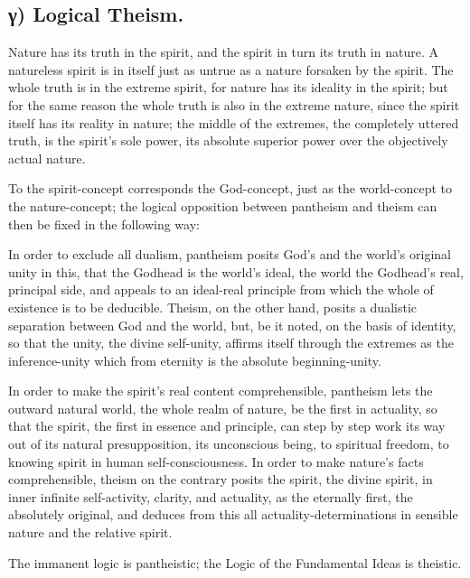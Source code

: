 \documentclass[12pt]{book}
\begin{document}
\subsection*{γ) Logical Theism.}

Nature has its truth in the spirit, and the spirit in turn its truth
in nature. A natureless spirit is in itself just as untrue as a
nature forsaken by the spirit. The whole truth is in the extreme
spirit, for nature has its ideality in the spirit; but for the same
reason the whole truth is also in the extreme nature, since the
spirit itself has its reality in nature; the middle of the extremes,
the completely uttered truth, is the spirit's sole power, its
absolute superior power over the objectively actual nature.

To the spirit-concept corresponds the God-concept, just as the
world-concept to the nature-concept; the logical opposition between
pantheism and theism can then be fixed in the following way:

In order to exclude all dualism, pantheism posits God's and the
world's original unity in this, that the Godhead is the world's
ideal, the world the Godhead's real, principal side, and appeals to
an ideal-real principle from which the whole of existence is to be
deducible. Theism, on the other hand, posits a
dualistic separation between God and the world, but, be it noted, on
the basis of identity, so that the unity, the divine self-unity,
affirms itself through the extremes as the inference-unity which
from eternity is the absolute beginning-unity.

In order to make the spirit's real content comprehensible, pantheism
lets the outward natural world, the whole realm of nature, be the
first in actuality, so that the spirit, the first in essence and
principle, can step by step work its way out of its natural
presupposition, its unconscious being, to spiritual freedom, to
knowing spirit in human self-consciousness. In order to make
nature's facts comprehensible, theism on the contrary posits the
spirit, the divine spirit, in inner infinite self-activity, clarity,
and actuality, as the eternally first, the absolutely original, and
deduces from this all actuality-determinations in sensible nature
and the relative spirit.

The immanent logic is pantheistic; the Logic of the Fundamental
Ideas is theistic.
\end{document}
